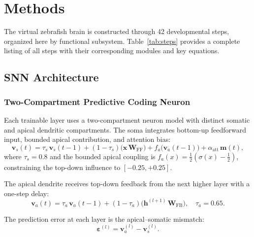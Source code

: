 \documentclass[12pt]{article}
\begin{document}
\section{Methods}\label{sec:methods}

The virtual zebrafish brain is constructed through 42 developmental
steps, organized here by functional subsystem.
Table~\ref{tab:steps} provides a complete listing of all steps with
their corresponding modules and key equations.

\subsection{SNN Architecture}\label{sec:snn}

\subsubsection{Two-Compartment Predictive Coding Neuron}

Each trainable layer uses a two-compartment neuron model with distinct
somatic and apical dendritic compartments.
The soma integrates bottom-up feedforward input, bounded apical
contribution, and attention bias:
\begin{equation}\label{eq:soma}
  \mathbf{v}_s(t) = \tau_s\,\mathbf{v}_s(t{-}1)
    + (1 - \tau_s)\bigl(\mathbf{x}\,\mathbf{W}_\text{FF}\bigr)
    + f_a\!\bigl(\mathbf{v}_a(t{-}1)\bigr)
    + \alpha_\text{att}\,\mathbf{m}(t),
\end{equation}
where $\tau_s = 0.8$ and the bounded apical coupling is
$f_a(x) = \frac{1}{2}(\sigma(x) - \frac{1}{2})$, constraining
the top-down influence to $[-0.25, +0.25]$.

The apical dendrite receives top-down feedback from the next higher
layer with a one-step delay:
\begin{equation}\label{eq:apical}
  \mathbf{v}_a(t) = \tau_a\,\mathbf{v}_a(t{-}1)
    + (1 - \tau_a)\bigl(\mathbf{h}^{(l+1)}\,\mathbf{W}_\text{FB}\bigr),
  \quad \tau_a = 0.65.
\end{equation}

The prediction error at each layer is the apical--somatic mismatch:
\begin{equation}\label{eq:pred_error}
  \boldsymbol{\varepsilon}^{(l)} = \mathbf{v}_a^{(l)} - \mathbf{v}_s^{(l)}.
\end{equation}
\end{document}
